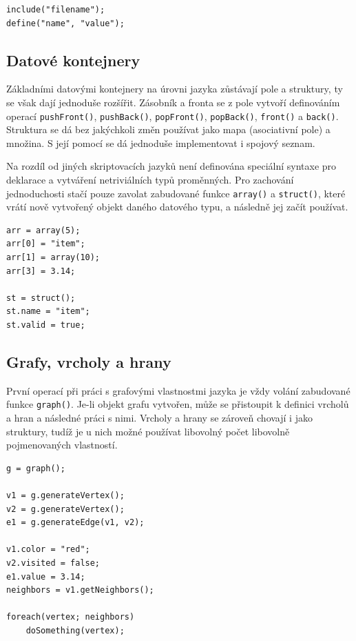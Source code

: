 \documentclass[11pt,twoside,a4paper]{book}
\begin{document}
\begin{verbatim}
include("filename");
define("name", "value");
\end{verbatim}


\subsection{Datové kontejnery}

Základními datovými kontejnery na úrovni jazyka zůstávají pole a struktury, ty se však dají jednoduše rozšířit. Zásobník a fronta se z pole vytvoří definováním operací \texttt{pushFront()}, \texttt{push\-Back()}, \texttt{popFront()}, \texttt{popBack()}, \texttt{front()} a \texttt{back()}. Struktura se dá bez jakýchkoli změn po\-u\-ží\-vat jako mapa (asociativní pole) a množina. S její pomocí se dá jednoduše implementovat i spojový seznam.

Na rozdíl od jiných skriptovacích jazyků není definována speciální syntaxe pro deklarace a vytváření netriviálních typů proměnných. Pro zachování jednoduchosti stačí pouze zavolat zabudované funkce \texttt{array()} a \texttt{struct()}, které vrátí nově vytvořený objekt daného datového typu, a ná\-sled\-ně jej začít používat.

\begin{verbatim}
arr = array(5);
arr[0] = "item";
arr[1] = array(10);
arr[3] = 3.14;

st = struct();
st.name = "item";
st.valid = true;
\end{verbatim}


\subsection{Grafy, vrcholy a hrany}

První operací při práci s grafovými vlastnostmi jazyka je vždy volání zabudované funkce \texttt{graph()}. Je-li objekt grafu vytvořen, může se přistoupit k definici vrcholů a hran a následné práci s nimi. Vrcholy a hrany se zároveň chovají i jako struktury, tudíž je u nich možné používat libovolný počet libovolně pojmenovaných vlastností.

\begin{verbatim}
g = graph();

v1 = g.generateVertex();
v2 = g.generateVertex();
e1 = g.generateEdge(v1, v2);

v1.color = "red";
v2.visited = false;
e1.value = 3.14;
neighbors = v1.getNeighbors();

foreach(vertex; neighbors)
    doSomething(vertex);
\end{verbatim}
\end{document}
